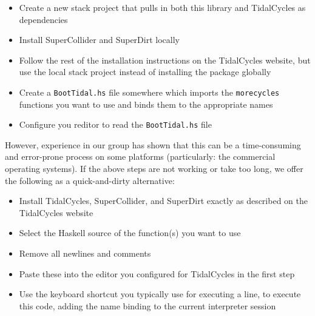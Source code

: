 \begin{itemize}
  \item Create a new stack project that pulls in both this library and TidalCycles as dependencies
  \item Install SuperCollider and SuperDirt locally
  \item Follow the rest of the installation instructions on the TidalCycles website, but use the local stack project instead of installing the package globally
  \item Create a \verb|BootTidal.hs| file somewhere which imports the \verb|morecycles| functions you want to use and binds them to the appropriate names
  \item Configure you reditor to read the \verb|BootTidal.hs| file
\end{itemize}

However, experience in our group has shown that this can be a time-consuming and error-prone process on some platforms (particularly: the commercial operating systems).
If the above steps are not working or take too long, we offer the following as a quick-and-dirty alternative:

\begin{itemize}
  \item Install TidalCycles, SuperCollider, and SuperDirt exactly as described on the TidalCycles website
  \item Select the Haskell source of the function(s) you want to use
  \item Remove all newlines and comments
  \item Paste these into the editor you configured for TidalCycles in the first step
  \item Use the keyboard shortcut you typically use for executing a line, to execute this code, adding the name binding to the current interpreter session
\end{itemize}
